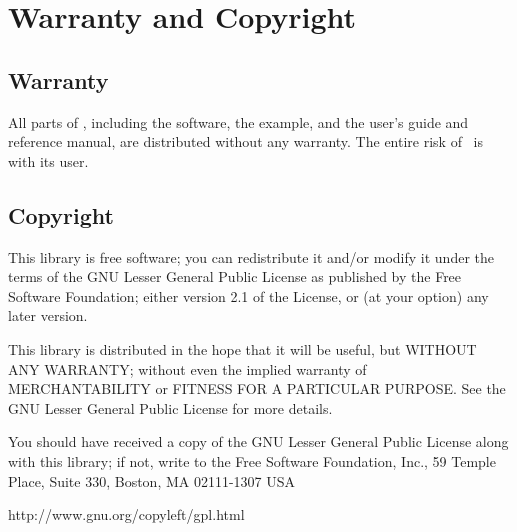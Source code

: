 
\chapter{Warranty and Copyright}

\section{Warranty}

All parts of \ABACUS, including the software, the example, and the
user's guide and reference manual, are distributed without any
warranty. The entire risk of \ABACUS\ is with its user.

\section{Copyright}

\par                                                                           
This library is free software; you can redistribute it and/or              
modify it under the terms of the GNU Lesser General Public                 
License as published by the Free Software Foundation; either               
version 2.1 of the License, or (at your option) any later version.         
    
\par                                                                       
This library is distributed in the hope that it will be useful,            
but WITHOUT ANY WARRANTY; without even the implied warranty of             
MERCHANTABILITY or FITNESS FOR A PARTICULAR PURPOSE.  See the GNU          
Lesser General Public License for more details.                            
    
\par                                                                       
You should have received a copy of the GNU Lesser General Public           
License along with this library; if not, write to the Free Software        
Foundation, Inc., 59 Temple Place, Suite 330, Boston, MA  02111-1307  USA  

\see http://www.gnu.org/copyleft/gpl.html
